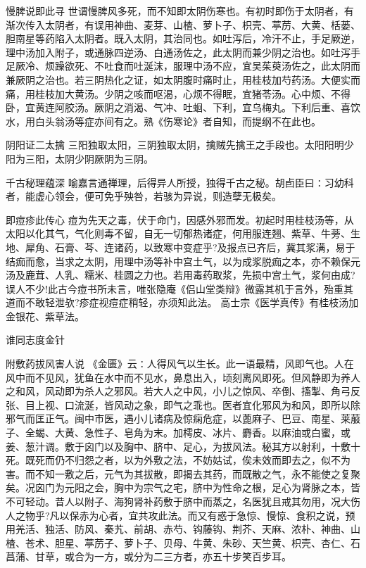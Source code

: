 \documentclass[a4paper,12pt,UTF8,twoside]{ctexbook}
\begin{document}
    慢脾说即此寻
    世谓慢脾风多死，而不知即太阴伤寒也。有初时即伤于太阴者，有渐次传入太阴者，有误用神曲、麦芽、山楂、萝卜子、枳壳、葶苈、大黄、栝蒌、胆南星等药陷入太阴者。既入太阴，其治同也。如吐泻后，冷汗不止，手足厥逆，理中汤加入附子，或通脉四逆汤、白通汤佐之，此太阴而兼少阴之治也。如吐泻手足厥冷、烦躁欲死、不吐食而吐涎沫，服理中汤不应，宜吴茱萸汤佐之，此太阴而兼厥阴之治也。若三阴热化之证，如太阴腹时痛时止，用桂枝加芍药汤。大便实而痛，用桂枝加大黄汤。少阴之咳而呕渴，心烦不得眠，宜猪苓汤。心中烦、不得卧，宜黄连阿胶汤。厥阴之消渴、气冲、吐蛔、下利，宜乌梅丸。下利后重、喜饮水，用白头翁汤等症亦间有之。熟《伤寒论》者自知，而提纲不在此也。
    
    阴阳证二太擒
    三阳独取太阳，三阴独取太阴，擒贼先擒王之手段也。太阳阳明少阳为三阳，太阴少阴厥阴为三阴。
    
    千古秘理蕴深
    喻嘉言通禅理，后得异人所授，独得千古之秘。胡卣臣曰∶习幼科者，能虚心领会，便可免乎殃咎，若骇为异说，则造孽无极矣。
    
    即痘疹此传心
    痘为先天之毒，伏于命门，因感外邪而发。初起时用桂枝汤等，从太阳以化其气，气化则毒不留，自无一切郁热诸症，何用服连翘、紫草、牛蒡、生地、犀角、石膏、芩、连诸药，以致寒中变症乎?及报点已齐后，冀其浆满，易于结痂而愈，当求之太阴，用理中汤等补中宫土气，以为成浆脱痂之本，亦不赖保元汤及鹿茸、人乳、糯米、桂圆之力也。若用毒药取浆，先损中宫土气，浆何由成?误人不少!此古今痘书所未言，唯张隐庵《侣山堂类辩》微露其机于言外，殆重其道而不敢轻泄欤?疹症视痘症稍轻，亦须知此法。
    高士宗《医学真传》有桂枝汤加金银花、紫草法。
    
    谁同志度金针
    
    
    附敷药拔风害人说	
    《金匮》云∶人得风气以生长。此一语最精，风即气也。人在风中而不见风，犹鱼在水中而不见水，鼻息出入，顷刻离风即死。但风静即为养人之和风，风动即为杀人之邪风。若大人之中风，小儿之惊风、卒倒、搐掣、角弓反张、目上视、口流涎，皆风动之象，即气之乖也。医者宜化邪风为和风，即所以除邪气而匡正气。闽中市医，遇小儿诸病及惊痫危症，以蓖麻子、巴豆、南星、莱菔子、全蝎、大黄、急性子、皂角为末。加樗皮、冰片、麝香。以麻油或白蜜，或姜、葱汁调。敷于囟门以及胸中、脐中、足心，为拔风法。秘其方以射利，十敷十死。既死而仍不归怨之者，以为外敷之法，不妨姑试，俟未效而即去之，似不为害。而不知一敷之后，元气为其拔散，即揭去其药，而既散之气，永不能使之复聚矣。况囟门为元阳之会，胸中为宗气之宅，脐中为性命之根，足心为肾脉之本，皆不可轻动。昔人以附子、海狗肾补药敷于脐中而蒸之，名医犹且戒其勿用，况大伤人之物乎?凡以保赤为心者，宜共攻此法。而又有惑于急惊、慢惊、食积之说，预用羌活、独活、防风、秦艽、前胡、赤芍、钩藤钩、荆芥、天麻、浓朴、神曲、山楂、苍术、胆星、葶苈子、萝卜子、贝母、牛黄、朱砂、天竺黄、枳壳、杏仁、石菖蒲、甘草，或合为一方，或分为二三方者，亦五十步笑百步耳。
    
\end{document}
